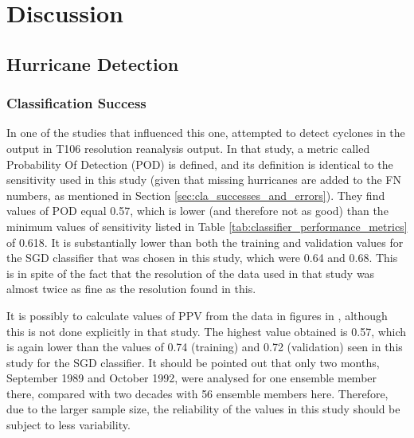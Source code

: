 \documentclass[pdftex,12pt,a4paper]{report}
\newcommand{\ts}{\textsuperscript}
\begin{document}

\chapter{Discussion}
\label{chap:discussion}

\section{Hurricane Detection}

\subsection{Classification Success}
In one of the studies that influenced this one, \textcite{walsh1997objective} attempted to detect
cyclones in the output in T106 resolution reanalysis output. In that study, a metric called
Probability Of Detection (POD) is defined, and its definition is identical to the sensitivity used
in this study (given that missing hurricanes are added to the FN numbers, as mentioned in Section
\ref{sec:cla_successes_and_errors}). They find values of POD equal \SI{0.57}{}, which is
lower (and therefore not as good) than the minimum values of sensitivity listed in Table
\ref{tab:classifier_performance_metrics} of \SI{0.618}{}. It is substantially lower than both the
training and validation values for the SGD classifier that was chosen in this study, which were
\SI{0.64}{} and \SI{0.68}{}. This is in spite of the fact that the resolution of the data used in
that study was almost twice as fine as the resolution found in this.

It is possibly to calculate values of PPV from the data in figures in \textcite{walsh1997objective},
although this is not done explicitly in that study. The highest value obtained is \SI{0.57}{}, which
is again lower than the values of \SI{0.74}{} (training) and \SI{0.72}{} (validation) seen in this
study for the SGD classifier. It should be pointed out that only two months, September 1989 and
October 1992, were analysed for one ensemble member there, compared with two decades with 56
ensemble members here. Therefore, due to the larger sample size, the reliability of the values in
this study should be subject to less variability.
\end{document}
